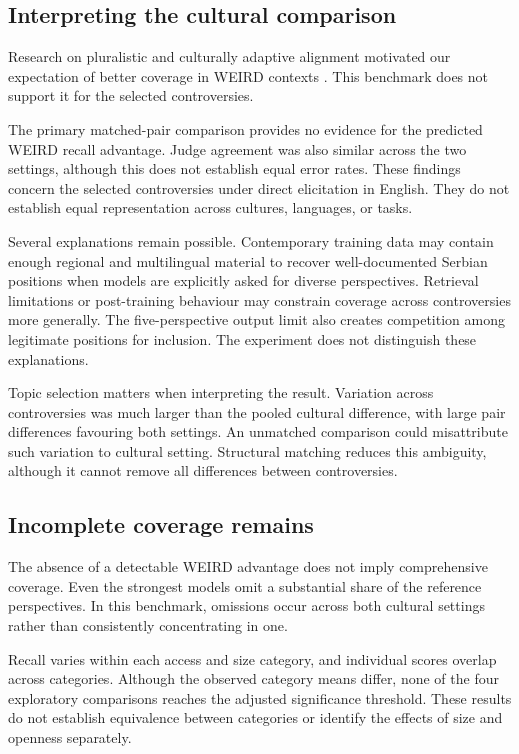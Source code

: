 \documentclass[11pt,a4paper]{article}
\begin{document}
\subsection{Interpreting the cultural comparison}
Research on pluralistic and culturally adaptive alignment motivated our expectation of better coverage in WEIRD contexts \citep{sorensenRoadmapPluralisticAlignment2024,fengModularPluralismPluralistic2024,wangMultilingualPromptingImproving2025}. This benchmark does not support it for the selected controversies.

The primary matched-pair comparison provides no evidence for the predicted WEIRD recall advantage. Judge agreement was also similar across the two settings, although this does not establish equal error rates. These findings concern the selected controversies under direct elicitation in English. They do not establish equal representation across cultures, languages, or tasks.

Several explanations remain possible. Contemporary training data may contain enough regional and multilingual material to recover well-documented Serbian positions when models are explicitly asked for diverse perspectives. Retrieval limitations or post-training behaviour may constrain coverage across controversies more generally. The five-perspective output limit also creates competition among legitimate positions for inclusion. The experiment does not distinguish these explanations.

Topic selection matters when interpreting the result. Variation across controversies was much larger than the pooled cultural difference, with large pair differences favouring both settings. An unmatched comparison could misattribute such variation to cultural setting. Structural matching reduces this ambiguity, although it cannot remove all differences between controversies.

\subsection{Incomplete coverage remains}
\label{sec:Incomplete coverage remains the main problem}
The absence of a detectable WEIRD advantage does not imply comprehensive coverage. Even the strongest models omit a substantial share of the reference perspectives. In this benchmark, omissions occur across both cultural settings rather than consistently concentrating in one.

Recall varies within each access and size category, and individual scores overlap across categories. Although the observed category means differ, none of the four exploratory comparisons reaches the adjusted significance threshold. These results do not establish equivalence between categories or identify the effects of size and openness separately.
\end{document}
